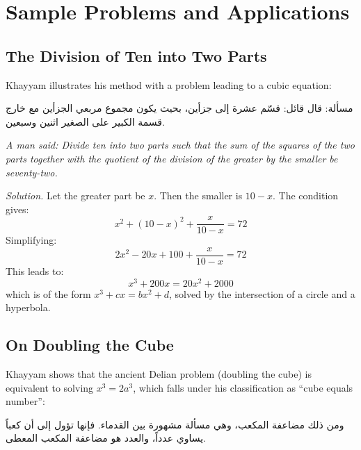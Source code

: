 \section{Sample Problems and Applications}

\label{sec:problems}


\subsection{The Division of Ten into Two Parts}

\label{subsec:division-ten}
Khayyam illustrates his method with a problem leading to a cubic equation:

\begin{propositionbox}

\begin{Arabic}
مسألة: قال قائل: قسّم عشرة إلى جزأين، بحيث يكون مجموع مربعي الجزأين مع خارج قسمة الكبير على الصغير اثنين وسبعين.

\end{Arabic}

\textit{A man said: Divide ten into two parts such that the sum of the squares of the two parts together with the quotient of the division of the greater by the smaller be seventy-two.}

\end{propositionbox}

\textit{Solution.} Let the greater part be $x$. Then the smaller is $10 - x$. The condition gives:
\[x^2 + (10 - x)^2 + 
\frac{x}{10 - x} = 72\]
Simplifying:
\[2x^2 - 20x + 100 + 
\frac{x}{10 - x} = 72\]
This leads to:
\[x^3 + 200x = 20x^2 + 2000\]
which is of the form $x^3 + cx = b x^2 + d$, solved by the intersection of a circle and a hyperbola.

\subsection{On Doubling the Cube}

\label{subsec:delian}
Khayyam shows that the ancient Delian problem (doubling the cube) is equivalent to solving $x^3 = 2a^3$, which falls under his classification as ``cube equals number'':

\begin{Arabic}
ومن ذلك مضاعفة المكعب، وهي مسألة مشهورة بين القدماء. فإنها تؤول إلى أن كعباً يساوي عدداً، والعدد هو مضاعفة المكعب المعطى.

\end{Arabic}

